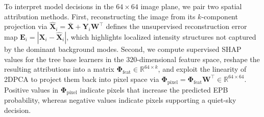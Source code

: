 To interpret model decisions in the $64 \times 64$ image plane, we pair two spatial attribution methods. First, reconstructing the image from its $k$-component projection via $\hat{\mathbf{X}}_i = \bar{\mathbf{X}} + \mathbf{Y}_i \mathbf{W}^\top$ defines the unsupervised reconstruction error map $\mathbf{E}_i = |\mathbf{X}_i - \hat{\mathbf{X}}_i|$, which highlights localized intensity structures not captured by the dominant background modes. Second, we compute supervised SHAP values \cite{lundberg2017unified} for the tree base learners in the $320$-dimensional feature space, reshape the resulting attributions into a matrix $\boldsymbol{\Phi}_{\text{feat}} \in \mathbb{R}^{64 \times k}$, and exploit the linearity of 2DPCA to project them back into pixel space via $\boldsymbol{\Phi}_{\text{pixel}} = \boldsymbol{\Phi}_{\text{feat}}\mathbf{W}^\top \in \mathbb{R}^{64 \times 64}$. Positive values in $\boldsymbol{\Phi}_{\text{pixel}}$ indicate pixels that increase the predicted EPB probability, whereas negative values indicate pixels supporting a quiet-sky decision.

